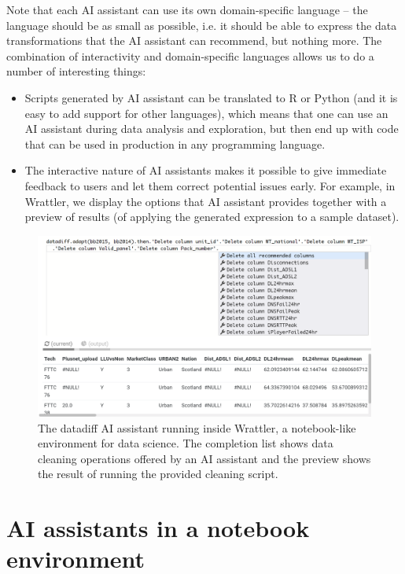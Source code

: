 \documentclass{article}
\begin{document}
Note that each AI assistant can use its own domain-specific language -- the language should be
as small as possible, i.e. it should be able to express the data transformations that the AI
assistant can recommend, but nothing more. The combination of interactivity and domain-specific 
languages allows us to do a number of interesting things:

\begin{itemize}
\item Scripts generated by AI assistant can be translated to R or Python (and it is easy to 
  add support for other languages), which means that one can use an AI assistant during data
  analysis and exploration, but then end up with code that can be used in production in any
  programming language.

\item The interactive nature of AI assistants makes it possible to give immediate feedback to
  users and let them correct potential issues early. For example, in Wrattler, we display the
  options that AI assistant provides together with a preview of results (of applying the
  generated expression to a sample dataset). 
\end{itemize}

\begin{figure}
\vspace{-1em}
\includegraphics[scale=0.29]{wrattler.png}
\caption{The datadiff AI assistant running inside Wrattler, a notebook-like environment for
data science. The completion list shows data cleaning operations offered by an AI assistant 
and the preview shows the result of running the provided cleaning script.}
\label{fig:wrattler}
\end{figure}

\section{AI assistants in a notebook environment}
\label{sec:notebook}
\end{document}
